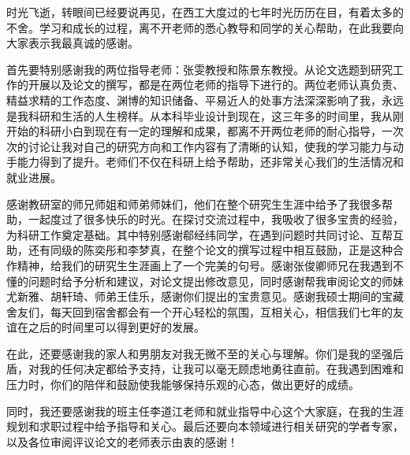 
\Thanks

时光飞逝，转眼间已经要说再见，在西工大度过的七年时光历历在目，有着太多的不舍。学习和成长的过程，离不开老师的悉心教导和同学的关心帮助，在此我要向大家表示我最真诚的感谢。

首先要特别感谢我的两位指导老师：张雯教授和陈景东教授。从论文选题到研究工作的开展以及论文的撰写，都是在两位老师的指导下进行的。两位老师认真负责、精益求精的工作态度、渊博的知识储备、平易近人的处事方法深深影响了我，永远是我科研和生活的人生榜样。从本科毕业设计到现在，这三年多的时间里，我从刚开始的科研小白到现在有一定的理解和成果，都离不开两位老师的耐心指导，一次次的讨论让我对自己的研究方向和工作内容有了清晰的认知，使我的学习能力与动手能力得到了提升。老师们不仅在科研上给予帮助，还非常关心我们的生活情况和就业进展。

感谢教研室的师兄师姐和师弟师妹们，他们在整个研究生生涯中给予了我很多帮助，一起度过了很多快乐的时光。在探讨交流过程中，我吸收了很多宝贵的经验，为科研工作奠定基础。其中特别感谢郗经纬同学，在遇到问题时共同讨论、互帮互助，还有同级的陈奕彤和李梦真，在整个论文的撰写过程中相互鼓励，正是这种合作精神，给我们的研究生生涯画上了一个完美的句号。感谢张俊卿师兄在我遇到不懂的问题时给予分析和建议，对论文提出修改意见，同时感谢帮我审阅论文的师妹尤新雅、胡轩琦、师弟王佳乐，感谢你们提出的宝贵意见。感谢我硕士期间的宝藏舍友们，每天回到宿舍都会有一个开心轻松的氛围，互相关心，相信我们七年的友谊在之后的时间里可以得到更好的发展。

在此，还要感谢我的家人和男朋友对我无微不至的关心与理解。你们是我的坚强后盾，对我的任何决定都给予支持，让我可以毫无顾虑地勇往直前。在我遇到困难和压力时，你们的陪伴和鼓励使我能够保持乐观的心态，做出更好的成绩。

同时，我还要感谢我的班主任李道江老师和就业指导中心这个大家庭，在我的生涯规划和求职过程中给予指导和关心。最后还要向本领域进行相关研究的学者专家，以及各位审阅评议论文的老师表示由衷的感谢！